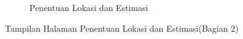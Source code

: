 \begin{enumerate}[a.]
\begin{figure} [H]
\begin{subfigure}{.5\textwidth}
		\caption{Penentuan Lokasi dan Estimasi}
	\end{subfigure}
	\vspace{1cm}
	\caption{Tampilan Halaman Penentuan Lokasi dan Estimasi(Bagian 2)}
	\label{aplikasipenggunabagian2}
\end{figure}




\end{enumerate}
